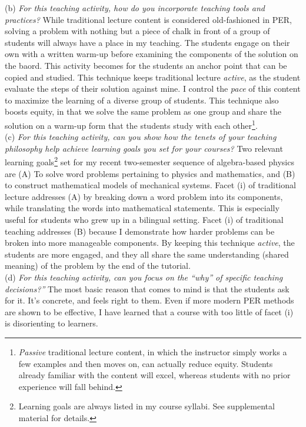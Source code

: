 \documentclass[../../../main.tex]{subfiles}
\begin{document}
(b) \textit{For this teaching activity, how do you incorporate teaching tools and practices?} While traditional lecture content is considered old-fashioned in PER, solving a problem with nothing but a piece of chalk in front of a group of students will always have a place in my teaching.  The students engage on their own with a written warm-up before examining the components of the solution on the baord.  This activity becomes for the students an anchor point that can be copied and studied.  This technique keeps traditional lecture \textit{active}, as the student evaluate the steps of their solution against mine.  I control the \textit{pace} of this content to maximize the learning of a diverse group of students.  This technique also boosts equity, in that we solve the same problem as one group and share the solution on a warm-up form that the students study with each other\footnote{\textit{Passive} traditional lecture content, in which the instructor simply works a few examples and then moves on, can actually reduce equity.  Students already familiar with the content will excel, whereas students with no prior experience will fall behind.}.
\\
\vspace{0.25cm}
(c) \textit{For this teaching activity, can you show how the tenets of your teaching philosophy help achieve learning goals you set for your courses?} Two relevant learning goals\footnote{Learning goals are always listed in my course syllabi.  See supplemental material for details.} set for my recent two-semester sequence of algebra-based physics are (A) To solve word problems pertaining to physics and mathematics, and (B) to construct mathematical models of mechanical systems.  Facet (i) of traditional lecture addresses (A) by breaking down a word problem into its components, while translating the words into mathematical statements.  This is especially useful for students who grew up in a bilingual setting.  Facet (i) of traditional teaching addresses (B) because I demonstrate how harder problems can be broken into more manageable components.  By keeping this technique \textit{active}, the students are more engaged, and they all share the same understanding (shared meaning) of the problem by the end of the tutorial.
\\
\vspace{0.25cm}
(d) \textit{For this teaching activity, can you focus on the ``why'' of specific teaching decisions?''}  The most basic reason that comes to mind is that the students ask for it.  It's concrete, and feels right to them.  Even if more modern PER methods are shown to be effective, I have learned that a course with too little of facet (i) is disorienting to learners.
\end{document}
